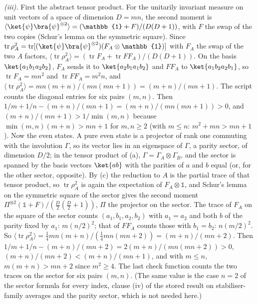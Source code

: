 \emph{(iii).} First the abstract tensor product. For the unitarily invariant measure on unit vectors of a space of dimension $D = mn$, the second moment is $\langle\ket{\psi}\bra{\psi}^{\otimes 2}\rangle = (\mathbb{1} + F)/(D(D + 1))$, with $F$ the swap of the two copies (Schur's lemma on the symmetric square). Since $\operatorname{tr}\rho_{A}^{2} = \operatorname{tr}[(\ket{\psi}\bra{\psi}^{\otimes 2})(F_{A} \otimes \mathbb{1})]$ with $F_{A}$ the swap of the two $A$ factors, $\langle\operatorname{tr}\rho_{A}^{2}\rangle = (\operatorname{tr}F_{A} + \operatorname{tr}FF_{A})/(D(D + 1))$. On the basis $\ket{a_{1}b_{1}a_{2}b_{2}}$, $F_{A}$ sends it to $\ket{a_{2}b_{1}a_{1}b_{2}}$ and $FF_{A}$ to $\ket{a_{1}b_{2}a_{2}b_{1}}$, so $\operatorname{tr}F_{A} = mn^{2}$ and $\operatorname{tr}FF_{A} = m^{2}n$, and $\langle\operatorname{tr}\rho_{A}^{2}\rangle = mn(m + n)/(mn(mn + 1)) = (m + n)/(mn + 1)$. The script counts the diagonal entries for six pairs $(m, n)$. Then $1/m + 1/n - (m + n)/(mn + 1) = (m + n)/(mn(mn + 1)) > 0$, and $(m + n)/(mn + 1) > 1/\min(m, n)$ because $\min(m, n)(m + n) > mn + 1$ for $m, n \geq 2$ (with $m \leq n$: $m^{2} + mn > mn + 1$). Now the even states. A pure even state is a projector of rank one commuting with the involution $\Gamma$, so its vector lies in an eigenspace of $\Gamma$, a parity sector, of dimension $D/2$; in the tensor product of (a), $\Gamma = \Gamma_{A} \otimes \Gamma_{B}$, and the sector is spanned by the basis vectors $\ket{ab}$ with the parities of $a$ and $b$ equal (or, for the other sector, opposite). By (c) the reduction to $A$ is the partial trace of that tensor product, so $\operatorname{tr}\rho_{A}^{2}$ is again the expectation of $F_{A} \otimes \mathbb{1}$, and Schur's lemma on the symmetric square of the sector gives the second moment $\Pi^{\otimes 2}(\mathbb{1} + F)/(\tfrac{D}{2}(\tfrac{D}{2} + 1))$, $\Pi$ the projector on the sector. The trace of $F_{A}$ on the square of the sector counts $(a_{1}, b_{1}, a_{2}, b_{2})$ with $a_{1} = a_{2}$ and both $b$ of the parity fixed by $a_{1}$: $m(n/2)^{2}$; that of $FF_{A}$ counts those with $b_{1} = b_{2}$: $n(m/2)^{2}$. So $\langle\operatorname{tr}\rho_{A}^{2}\rangle = \tfrac14 mn(m + n)/(\tfrac14 mn(mn + 2)) = (m + n)/(mn + 2)$. Then $1/m + 1/n - (m + n)/(mn + 2) = 2(m + n)/(mn(mn + 2)) > 0$, $(m + n)/(mn + 2) < (m + n)/(mn + 1)$, and with $m \le n$, $m(m + n) > mn + 2$ since $m^{2} \ge 4$. The last check function counts the two traces on the sector for six pairs $(m, n)$. (The same value is the case $n = 2$ of the sector formula for every index, clause (iv) of the stored result on stabiliser-family averages and the parity sector, which is not needed here.)


